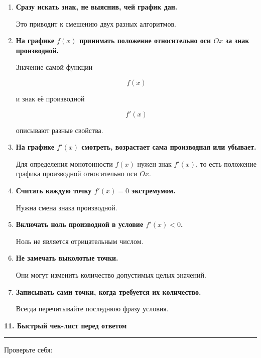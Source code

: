\documentclass[a4paper,12pt]{article}
\newcommand{\maintitle}[1]{%
    {\Large\bfseries\color{darkaccent}#1\par}
    \vspace{2mm}
    {\color{accent}\rule{\linewidth}{0.6pt}}
    \vspace{4mm}
}
\begin{document}
\begin{enumerate}
    \item \textbf{Сразу искать знак, не выяснив, чей график дан.}

    Это приводит к смешению двух разных алгоритмов.

    \item \textbf{На графике \(f(x)\) принимать положение относительно
    оси \(Ox\) за знак производной.}

    Значение самой функции

    \[
    f(x)
    \]

    и знак её производной

    \[
    f'(x)
    \]

    описывают разные свойства.

    \item \textbf{На графике \(f'(x)\) смотреть, возрастает сама
    производная или убывает.}

    Для определения монотонности \(f(x)\) нужен знак \(f'(x)\),
    то есть положение графика производной относительно оси \(Ox\).

    \item \textbf{Считать каждую точку \(f'(x)=0\) экстремумом.}

    Нужна смена знака производной.

    \item \textbf{Включать ноль производной в условие \(f'(x)<0\).}

    Ноль не является отрицательным числом.

    \item \textbf{Не замечать выколотые точки.}

    Они могут изменить количество допустимых целых значений.

    \item \textbf{Записывать сами точки, когда требуется их количество.}

    Всегда перечитывайте последнюю фразу условия.
\end{enumerate}

\maintitle{11. Быстрый чек-лист перед ответом}

Проверьте себя:
\end{document}
